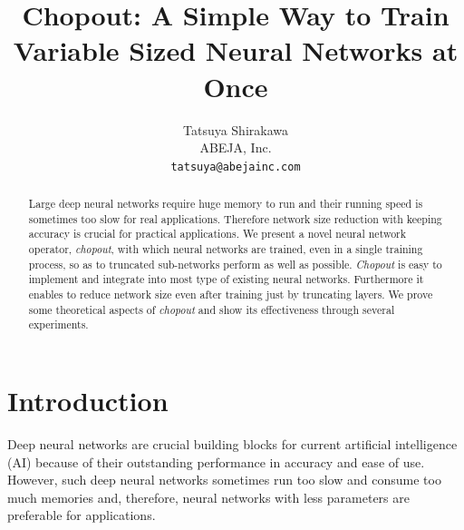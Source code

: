 \documentclass{article}
\title{Chopout: A Simple Way to Train Variable Sized Neural Networks at Once}
\author{
      Tatsuya Shirakawa \\
      ABEJA, Inc. \\
      \texttt{tatsuya@abejainc.com}
    }
\begin{document}
    
    \maketitle
    
    \begin{abstract}
      Large deep neural networks require huge memory to run and their running speed is sometimes too slow for real applications. Therefore network size reduction with keeping accuracy is crucial for practical applications. We present a novel neural network operator, \textit{chopout}, with which neural networks are trained, even in a single training process, so as to truncated sub-networks perform as well as possible. \textit{Chopout} is easy to implement and integrate into most type of existing neural networks. Furthermore it enables to reduce network size even after training just by truncating layers. We prove some theoretical aspects of \textit{chopout} and show its effectiveness through several experiments.
    \end{abstract}
    
    \section{Introduction}
    
    
    Deep neural networks are crucial building blocks for current artificial intelligence (AI)  because of their outstanding performance in accuracy and ease of use. However, such deep neural networks sometimes run too slow and consume too much memories and, therefore, neural networks with less parameters are preferable for applications.
    
\end{document}
